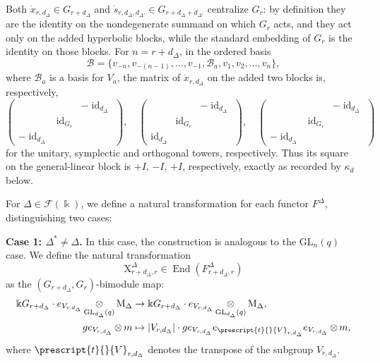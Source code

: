 \documentclass[12pt]{amsart}
\numberwithin{itemcounter}{subsection}
\theoremstyle{plain}
\theoremstyle{definition}
\theoremstyle{remark}
\numberwithin{equation}{section}
\def\k{\Bbbk}
\def\GL{\mathrm{GL}}
\def\M{{\operatorname{M}\nolimits}}
\def\End{\operatorname{End}\nolimits}
\def\id{\operatorname{id}\nolimits}
\def\End{{\operatorname{End}}}
\DeclareMathOperator*{\ot}{\otimes}
\begin{document}
Both $\dot{x}_{r,d_\Delta} \in G_{r+d_\Delta}$ and $\dot{s}_{r,d_\Delta,d_{\Delta'}} \in G_{r+d_\Delta+d_{\Delta'}}$ centralize $G_r$: by definition they are the identity on the nondegenerate summand on which $G_r$ acts, and they act only on the added hyperbolic blocks, while the standard embedding of $G_r$ is the identity on those blocks.  For $n = r + d_\Delta$, in the ordered basis
\[
\mathcal{B} = \{v_{-n}, v_{-(n-1)}, \dots, v_{-1}, \mathcal{B}_a, v_1, v_2, \dots, v_n\},
\]
where $\mathcal{B}_a$ is a basis for $V_a$, the matrix of $\dot{x}_{r,d_\Delta}$ on the added two blocks is,
respectively,
\[
\begin{pmatrix} & & -\id_{d_\Delta} \\ & \id_{G_r} & \\ -\id_{d_\Delta} & & \end{pmatrix},
\quad
\begin{pmatrix} & & -\id_{d_\Delta} \\ & \id_{G_r} & \\ \id_{d_\Delta} & & \end{pmatrix},
\quad
\begin{pmatrix} & & -\id_{d_\Delta} \\ & \id_{G_r} & \\ -\id_{d_\Delta} & & \end{pmatrix}
\]
for the unitary, symplectic and orthogonal towers, respectively.  Thus its square on the general-linear block is
$+I$, $-I$, $+I$, respectively, exactly as recorded by $\kappa_d$ below.

For $\Delta \in \mathcal{F}(\k)$, we define a natural transformation for each functor $F^\Delta$, distinguishing two cases:

\textbf{Case 1: $\Delta^* \neq \Delta$.}
In this case, the construction is analogous to the $\GL_n(q)$ case. We define the natural transformation
\[
\mathrm{X}^{\Delta}_{r+d_\Delta,r} \in \End(F^{\Delta}_{r+d_\Delta,r})
\]
as the $(G_{r+d_\Delta}, G_r)$-bimodule map:
\[
\begin{aligned}
\k G_{r+d_\Delta}\cdot  e_{V_{r,d_\Delta}} \ot_{\GL_{d_\Delta}(q)} \M_\Delta &\to \k G_{r+d_\Delta} \cdot e_{V_{r,d_\Delta}} \ot_{\GL_{d_\Delta}(q)} \M_\Delta, \\
g e_{V_{r,d_\Delta}} \ot m &\mapsto   |V_{r,d_\Delta}|\cdot  ge_{V_{r,d_\Delta}} e_{\prescript{t}{}{V}_{r,d_\Delta}} e_{V_{r,d_\Delta}}\ot m,
\end{aligned}
\]
where
$\prescript{t}{}{V}_{r,d_\Delta}$ denotes the transpose of the subgroup $V_{r,d_\Delta}$.
\end{document}
